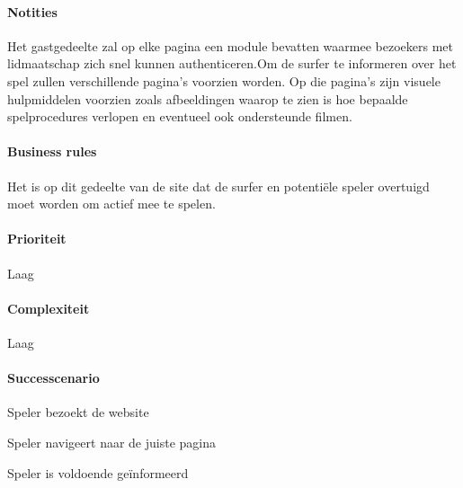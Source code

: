 \begin{compact}
\paragraph{Notities} Het gastgedeelte zal op elke pagina een module bevatten waarmee bezoekers met lidmaatschap zich snel kunnen authenticeren.\small{Om de surfer te informeren over het spel zullen verschillende pagina's voorzien worden. Op die pagina's zijn visuele hulpmiddelen voorzien zoals afbeeldingen waarop te zien is hoe bepaalde spelprocedures verlopen en eventueel ook ondersteunde filmen.}
\paragraph{Business rules}Het is op dit gedeelte van de site dat de surfer en potenti\"ele speler overtuigd moet worden om actief mee te spelen.
\paragraph{Prioriteit}Laag
\paragraph{Complexiteit}Laag
\paragraph{Successcenario}
\begin{enumerate_compact}
 \item Speler bezoekt de website
 \item Speler navigeert naar de juiste pagina
 \item Speler is voldoende ge\"informeerd
\end{enumerate_compact}
\end{compact}

